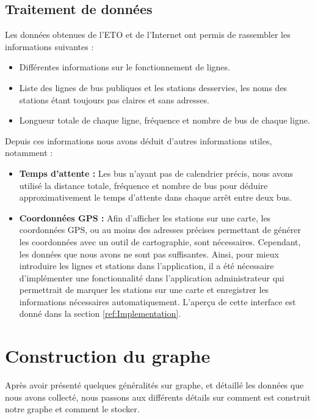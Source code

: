 \subsection{Traitement de données}
Les données obtenues de l'ETO et de l'Internet ont permis de rassembler les informations suivantes :
\begin{itemize}
	\item Différentes informations sur le fonctionnement de lignes.
	\item Liste des lignes de bus publiques et les stations desservies, les noms des stations étant toujours pas claires et sans adresses.
	\item Longueur totale de chaque ligne, fréquence et nombre de bus de chaque ligne.\newline 
\end{itemize}

Depuis ces informations nous avons déduit d'autres informations utiles, notamment :

\begin{itemize}
	\item \textbf{Temps d'attente : } Les bus n'ayant pas de calendrier précis, nous avons utilisé la distance totale, fréquence et nombre de bus pour déduire approximativement le temps d'attente dans chaque arrêt entre deux bus.
	\item \textbf{Coordonnées GPS :} Afin d'afficher les stations sur une carte, les coordonnées GPS, ou au moins des adresses précises permettant de générer les coordonnées avec un outil de cartographie, sont nécessaires. Cependant, les données que nous avons ne sont pas suffisantes. 
	Ainsi, pour mieux introduire les lignes et stations dans l'application, il a été nécessaire d'implémenter une fonctionnalité dans l'application administrateur qui permettrait de marquer les stations sur une carte et enregistrer les informations nécessaires automatiquement. L'aperçu de cette interface est donné dans la section \ref{ref:Implementation}.
\end{itemize}

	
\section{Construction du graphe}
Après avoir présenté quelques généralités sur graphe, et détaillé les données que nous avons collecté, nous passons aux différents détails sur comment est construit notre graphe et comment le stocker.
